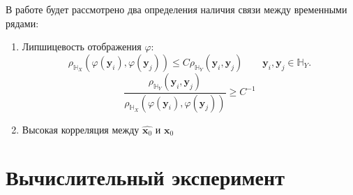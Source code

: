 \documentclass[a4paper,14pt]{article}
\renewcommand{\leq}{\ensuremath{\leqslant}}
\newcommand{\bx}{\mathbf{x}}
\newcommand{\by}{\mathbf{y}}
\newcommand{\dH}{\mathbb{H}}
\theoremstyle{plain} %
\theoremstyle{definition} %
\theoremstyle{remark} %
\begin{document}
	В работе будет рассмотрено два определения наличия связи между временными рядами:
	\begin{enumerate}
		\item Липшицевость отображения $\varphi$:
		$$\rho_{\dH_X}(\varphi(\by_i), \varphi(\by_j)) \leq C \rho_{\dH_Y}(\by_i, \by_j) \qquad \by_i, \by_j \in \dH_Y. $$
		$$ \dfrac{\rho_{\dH_Y}(\mathbf{y}_i, \mathbf{y}_j)}{\rho_{\dH_X}(\varphi(\mathbf{y}_i),  \varphi(\mathbf{y}_j))} \geqslant C^{-1}$$
		\item Высокая корреляция между $\widehat{\bx_0}$ и $\bx_0$
	\end{enumerate} 
	
	\section{Вычислительный эксперимент}
\end{document}
